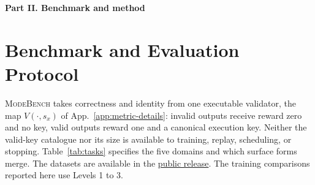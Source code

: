 \documentclass{article}
\newcommand{\1}{\mathbf 1}
\newcommand{\mb}{\textsc{ModeBench}}
\theoremstyle{remark}
\theoremstyle{definition}
\theoremstyle{plain}
\begin{document}

\clearpage
{}
\begin{center}\large\textbf{Part II. Benchmark and method}\end{center}

\section{Benchmark and Evaluation Protocol}
\label{app:data}
\label{app:experimental-design}
\label{app:domain-overview}
\label{app:data-inventory}

\mb{} takes correctness and identity from one executable validator, the map
$V(\cdot,s_x)$ of App.~\ref{app:metric-details}: invalid outputs receive reward
zero and no key, valid outputs reward one and a canonical execution key.
Neither the valid-key catalogue nor its size is available to training, replay,
scheduling, or stopping.
Table~\ref{tab:tasks} specifies the five domains and which surface forms merge.
The datasets are available in the
\href{https://huggingface.co/datasets/od2961/ModeBench}{public release}. The training
comparisons reported here use Levels 1 to 3.
\end{document}
